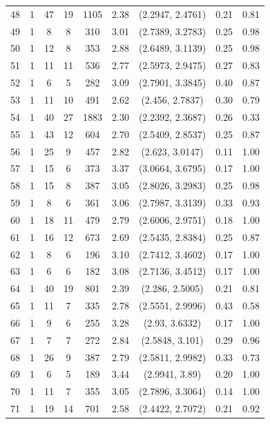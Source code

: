 \documentclass{article}
\begin{document}
\begin{appendices}
\begin{longtable}{ccccccccc}
48 &   1 &  47 &  19 & 1105 & 2.38 & (2.2947, 2.4761) & 0.21 & 0.81 \\ 
49 &   1 &   8 &   8 & 310 & 3.01 & (2.7389, 3.2783) & 0.25 & 0.98 \\ 
50 &   1 &  12 &   8 & 353 & 2.88 & (2.6489, 3.1139) & 0.25 & 0.98 \\ 
51 &   1 &  11 &  11 & 536 & 2.77 & (2.5973, 2.9475) & 0.27 & 0.83 \\ 
52 &   1 &   6 &   5 & 282 & 3.09 & (2.7901, 3.3845) & 0.40 & 0.87 \\ 
53 &   1 &  11 &  10 & 491 & 2.62 & (2.456, 2.7837) & 0.30 & 0.79 \\ 
54 &   1 &  40 &  27 & 1883 & 2.30 & (2.2392, 2.3687) & 0.26 & 0.33 \\ 
55 &   1 &  43 &  12 & 604 & 2.70 & (2.5409, 2.8537) & 0.25 & 0.87 \\ 
56 &   1 &  25 &   9 & 457 & 2.82 & (2.623, 3.0147) & 0.11 & 1.00 \\ 
57 &   1 &  15 &   6 & 373 & 3.37 & (3.0664, 3.6795) & 0.17 & 1.00 \\ 
58 &   1 &  15 &   8 & 387 & 3.05 & (2.8026, 3.2983) & 0.25 & 0.98 \\ 
59 &   1 &   8 &   6 & 361 & 3.06 & (2.7987, 3.3139) & 0.33 & 0.93 \\ 
60 &   1 &  18 &  11 & 479 & 2.79 & (2.6006, 2.9751) & 0.18 & 1.00 \\ 
61 &   1 &  16 &  12 & 673 & 2.69 & (2.5435, 2.8384) & 0.25 & 0.87 \\ 
62 &   1 &   8 &   6 & 196 & 3.10 & (2.7412, 3.4602) & 0.17 & 1.00 \\ 
63 &   1 &   6 &   6 & 182 & 3.08 & (2.7136, 3.4512) & 0.17 & 1.00 \\ 
64 &   1 &  40 &  19 & 801 & 2.39 & (2.286, 2.5005) & 0.21 & 0.81 \\ 
65 &   1 &  11 &   7 & 335 & 2.78 & (2.5551, 2.9996) & 0.43 & 0.58 \\ 
66 &   1 &   9 &   6 & 255 & 3.28 & (2.93, 3.6332) & 0.17 & 1.00 \\ 
67 &   1 &   7 &   7 & 272 & 2.84 & (2.5848, 3.101) & 0.29 & 0.96 \\ 
68 &   1 &  26 &   9 & 387 & 2.79 & (2.5811, 2.9982) & 0.33 & 0.73 \\ 
69 &   1 &   6 &   5 & 189 & 3.44 & (2.9941, 3.89) & 0.20 & 1.00 \\ 
70 &   1 &  11 &   7 & 355 & 3.05 & (2.7896, 3.3064) & 0.14 & 1.00 \\ 
71 &   1 &  19 &  14 & 701 & 2.58 & (2.4422, 2.7072) & 0.21 & 0.92 \\ 

\end{longtable}
\end{appendices}
\end{document}
